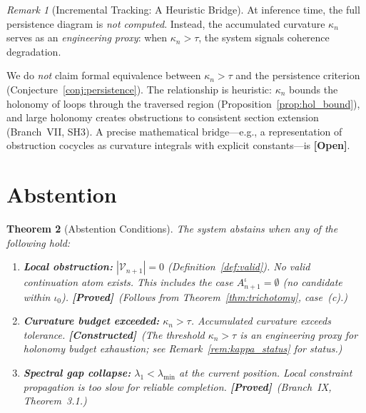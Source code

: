 \documentclass[11pt,a4paper]{article}
\newtheorem{theorem}{Theorem}[section]
\theoremstyle{definition}
\theoremstyle{remark}
\newtheorem{remark}[theorem]{Remark}
\newcommand{\statusproved}{\textcolor{green!50!black}{\textbf{[Proved]}}}
\newcommand{\statusconstructed}{\textcolor{blue!70!black}{\textbf{[Constructed]}}}
\newcommand{\statusopen}{\textcolor{red!70!black}{\textbf{[Open]}}}
\begin{document}

\begin{remark}[Incremental Tracking: A Heuristic Bridge]%
\label{rem:local_tracking}
At inference time, the full persistence diagram is \emph{not 
computed}. Instead, the accumulated curvature $\kappa_n$ serves 
as an \emph{engineering proxy}: when $\kappa_n > \tau$, the 
system signals coherence degradation. 

We do \emph{not} claim formal equivalence between $\kappa_n > \tau$ 
and the persistence criterion 
(Conjecture~\ref{conj:persistence}). The relationship is 
heuristic: $\kappa_n$ bounds the holonomy of loops through the 
traversed region (Proposition~\ref{prop:hol_bound}), and large 
holonomy creates obstructions to consistent section extension 
(Branch~VII, SH3). A precise mathematical bridge---e.g., a 
representation of obstruction cocycles as curvature integrals 
with explicit constants---is \statusopen.
\end{remark}


\section{Abstention}\label{sec:abstention}


\begin{theorem}[Abstention Conditions]\label{thm:abstention}
The system abstains when any of the following hold:
\begin{enumerate}[label=(\alph*),nosep]
    \item \textbf{Local obstruction:} 
    $|\mathcal{V}_{n+1}| = 0$ (Definition~\ref{def:valid}). 
    No valid continuation atom exists. This includes the case 
    $A_{n+1}^{\iota} = \emptyset$ (no candidate within 
    $\iota_0$). \statusproved\ (Follows from 
    Theorem~\ref{thm:trichotomy}, case~(c).)
    \item \textbf{Curvature budget exceeded:} 
    $\kappa_n > \tau$. Accumulated curvature exceeds tolerance. 
    \statusconstructed\ (The threshold $\kappa_n > \tau$ is an 
    engineering proxy for holonomy budget exhaustion; see 
    Remark~\ref{rem:kappa_status} for status.)
    \item \textbf{Spectral gap collapse:} $\lambda_1 < \lambda_{\min}$ 
    at the current position. Local constraint propagation is too 
    slow for reliable completion. \statusproved\ (Branch~IX, 
    Theorem~3.1.)
\end{enumerate}
\end{theorem}
\end{document}
